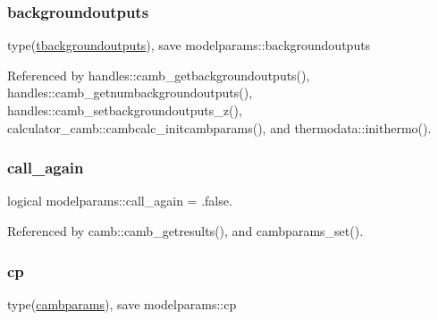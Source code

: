 \subsubsection{\texorpdfstring{backgroundoutputs}{backgroundoutputs}}
{\footnotesize\ttfamily type(\mbox{\hyperlink{structmodelparams_1_1tbackgroundoutputs}{tbackgroundoutputs}}), save modelparams\+::backgroundoutputs}



Referenced by handles\+::camb\+\_\+getbackgroundoutputs(), handles\+::camb\+\_\+getnumbackgroundoutputs(), handles\+::camb\+\_\+setbackgroundoutputs\+\_\+z(), calculator\+\_\+camb\+::cambcalc\+\_\+initcambparams(), and thermodata\+::inithermo().

\mbox{\label{namespacemodelparams_a188f571d5f56be7a62bb3079ef44c3ce}} 
\subsubsection{\texorpdfstring{call\+\_\+again}{call\_again}}
{\footnotesize\ttfamily logical modelparams\+::call\+\_\+again = .false.}



Referenced by camb\+::camb\+\_\+getresults(), and cambparams\+\_\+set().

\mbox{\label{namespacemodelparams_a957df29b9a56a2cfc2a8cb27d46daa2d}} 
\subsubsection{\texorpdfstring{cp}{cp}}
{\footnotesize\ttfamily type(\mbox{\hyperlink{structmodelparams_1_1cambparams}{cambparams}}), save modelparams\+::cp}



